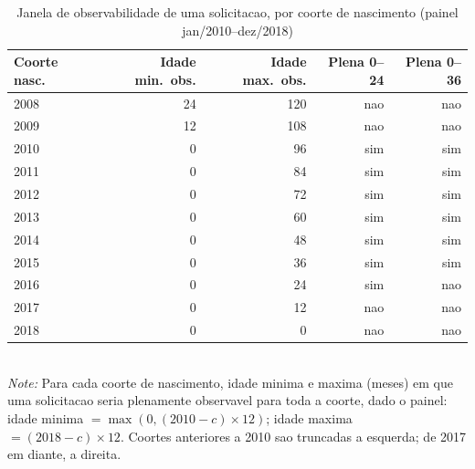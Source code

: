 \begin{table}[htbp]\centering
\caption{Janela de observabilidade de uma solicitacao, por coorte de nascimento (painel jan/2010--dez/2018)}
\label{tab:S1a_janelas}
\small
\begin{tabular}{lrrrr}
\toprule
Coorte nasc. & Idade min.\ obs. & Idade max.\ obs. & Plena 0--24 & Plena 0--36 \\
\midrule
2008 & 24 & 120 & nao & nao \\
2009 & 12 & 108 & nao & nao \\
2010 & 0 & 96 & sim & sim \\
2011 & 0 & 84 & sim & sim \\
2012 & 0 & 72 & sim & sim \\
2013 & 0 & 60 & sim & sim \\
2014 & 0 & 48 & sim & sim \\
2015 & 0 & 36 & sim & sim \\
2016 & 0 & 24 & sim & nao \\
2017 & 0 & 12 & nao & nao \\
2018 & 0 & 0 & nao & nao \\
\bottomrule
\end{tabular}
\\[3pt]{\footnotesize \textit{Note:} Para cada coorte de nascimento, idade minima e maxima (meses) em que uma solicitacao seria plenamente observavel para toda a coorte, dado o painel: idade minima $=\max(0,(2010-c)\times 12)$; idade maxima $=(2018-c)\times 12$. Coortes anteriores a 2010 sao truncadas a esquerda; de 2017 em diante, a direita. }
\end{table}

